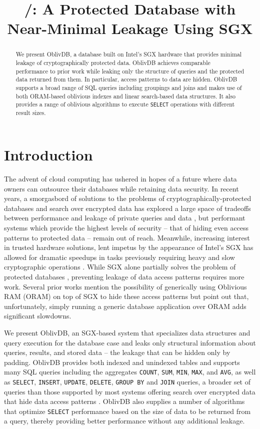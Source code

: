 \documentclass[USenglish,oneside,twocolumn]{article}
\author{}
\title{\textbf{\name/: A Protected Database with Near-Minimal Leakage Using SGX}}
\def\name/{OblivDB}
\begin{document}
\maketitle
  \begin{abstract}
{We present \name/, a database built on Intel's SGX hardware that provides minimal leakage of cryptographically protected data. \name/ achieves comparable performance to prior work while leaking only the structure of queries and the protected data returned from them. In particular, access patterns to data are hidden. \name/ supports a broad range of SQL queries including groupings and joins and makes use of both ORAM-based oblivious indexes and linear search-based data structures. It also provides a range of oblivious algorithms to execute \texttt{SELECT} operations with different result sizes. 
}
\end{abstract} 

\section{Introduction}

The advent of cloud computing has ushered in hopes of a future where data owners can outsource their databases while retaining data security. In recent years, a smorgasbord of solutions to the problems of cryptographically-protected databases and search over encrypted data has explored a large space of tradeoffs between performance and leakage of private queries and data \cite{FVY+17}, but performant systems which provide the highest levels of security -- that of hiding even access patterns to protected data -- remain out of reach. Meanwhile, increasing interest in trusted hardware solutions, lent impetus by the appearance of Intel's SGX \cite{CD16} has allowed for dramatic speedups in tasks previously requiring heavy and slow cryptographic operations \cite{FVBG16, NFR+17}. While SGX alone partially solves the problem of protected databases \cite{FBB+17}, preventing leakage of data access patterns requires more work. Several prior works \cite{PBP16, DPP+16, FVY+17} mention the possibility of generically using Oblivious RAM (ORAM) on top of SGX to hide these access patterns but point out that, unfortunately, simply running a generic database application over ORAM adds significant slowdowns.

We present \name/, an SGX-based system that specializes data structures and query execution for the database case and leaks only structural information about queries, results, and stored data -- the leakage that can be hidden only by padding. \name/ provides both indexed and unindexed tables and supports many SQL queries including the aggregates \texttt{COUNT}, \texttt{SUM}, \texttt{MIN}, \texttt{MAX}, and \texttt{AVG}, as well as \texttt{SELECT}, \texttt{INSERT}, \texttt{UPDATE}, \texttt{DELETE}, \texttt{GROUP BY} and \texttt{JOIN} queries, a broader set of queries than those supported by most systems offering search over encrypted data that hide data access patterns \cite{FVY+17}. \name/ also supplies a number of algorithms that optimize \texttt{SELECT} performance based on the size of data to be returned from a query, thereby providing better performance without any additional leakage. 
\end{document}
